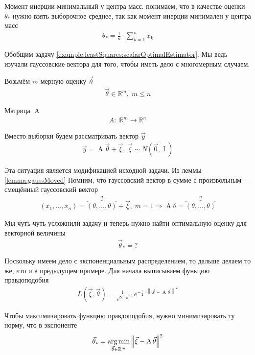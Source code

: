 \begin{example}
{      Момент инерции минимальный у центра масс.}
  понимаем, что в качестве оценки $\theta_*$ нужно взять выборочное среднее,
  так как момент инерции минимален у центра масс
  \begin{align*}
      \theta_* = \frac{1}{n} \cdot \sum_{k=1}^{n} x_k
  \end{align*}
\end{example}

\begin{example}\label{example:leastSquares:vectorOptimalEstimator}
  Обобщим задачу \ref{example:leastSquares:scalarOptimalEstimator}.
  Мы ведь изучали гауссовские вектора для того, чтобы иметь дело с многомерным
  случаем.

  Возьмём $m$-мерную оценку $\vec{\theta}$
  \begin{align*}
      \vec{\theta} \in \mathbb{R}^m,\; m \le n
  \end{align*}

  Матрица $\operatorname{A}$
  \begin{align*}
      A:\; \mathbb{R}^m \rightarrow \mathbb{R}^n
  \end{align*}

  Вместо выборки \xsample будем рассматривать вектор $\vec{y}$
  \begin{align*}
      \vec{y} = \operatorname{A} \vec{\theta} + \vec{\xi},\;
      \vec{\xi} \sim N\left( \vec{0}, \operatorname{I} \right)
  \end{align*}

  Эта ситуация является модификацией исходной задачи. Из леммы
  \ref{lemma:gaussMoved} Помним, что гауссовский вектор в сумме с произвольным
  --- смещённый гауссовский вектор
  \begin{align*}
      \left( x_1, \dots, x_n \right)
      = \overbrace{\left( \theta, \dots, \theta \right)}^{n} + \vec{\xi},\;
      m=1 \Rightarrow \operatorname{A} \theta
      = \overbrace{\left( \theta, \dots, \theta \right)}^{n}
  \end{align*}

  Мы чуть-чуть усложнили задачу и теперь нужно найти оптимальную оценку для
  векторной величины
  \begin{align*}
      \vec{\theta}_* = ?
  \end{align*}

  Поскольку имеем дело с экспоненциальным распределением, то дальше делаем то
  же, что и в предыдущем примере. Для начала выписываем функцию правдоподобия
  \begin{align*}
      L\left( \vec{\xi}, \vec{\theta} \right)
      = \frac{1}{\sqrt{2 \cdot \pi}} \cdot e^{-\frac{1}{2}
      \cdot \left\| \vec{x} - \operatorname{A} \vec{\theta} \right\|^2}
  \end{align*}

  Чтобы максимизировать функцию правдоподобия, нужно минимизировать ту норму,
  что в экспоненте
  \begin{align*}
      \vec{\theta}_*
      = \argminof{\left\| \vec{\xi}
      - \operatorname{A} \vec{\theta} \right\|^2}{
          \vec{\theta} \in \mathbb{R}^m}
  \end{align*}
\end{example}

